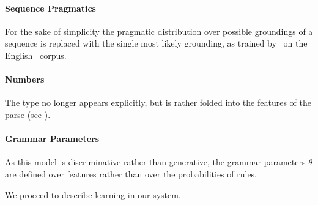 \paragraph{Sequence Pragmatics}
For the sake of simplicity the pragmatic distribution over
  possible groundings of a sequence is replaced with the single most likely
  grounding, as trained by \me\ on the English \tempeval\ corpus.

\paragraph{Numbers}
The  type no longer appears explicitly, but is rather folded
  into the features of the parse (see ).

\paragraph{Grammar Parameters}
As this model is discriminative rather than generative, the grammar
  parameters $\theta$ are defined over features rather than over the
  probabilities of rules.


We proceed to describe learning in our system.
